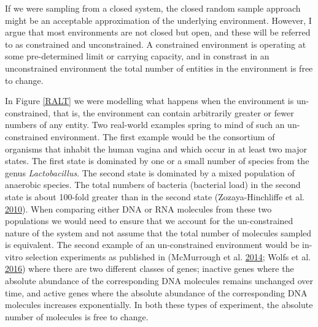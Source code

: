 \documentclass[onecolumn]{book}
\theoremstyle{definition}
\theoremstyle{definition}
\theoremstyle{definition}
\theoremstyle{remark}
\begin{document}
If we were sampling from a closed system, the closed random sample
approach might be an acceptable approximation of the underlying
environment. However, I argue that most environments are not closed but
open, and these will be referred to as constrained and unconstrained. A
constrained environment is operating at some pre-determined limit or
carrying capacity, and in constrast in an unconstrained environment the
total number of entities in the environment is free to change.

In Figure \ref{RALT} we were modelling what happens when the environment
is un-constrained, that is, the environment can contain arbitrarily
greater or fewer numbers of any entity. Two real-world examples spring
to mind of such an un-constrained environment. The first example would
be the consortium of organisms that inhabit the human vagina and which
occur in at least two major states. The first state is dominated by one
or a small number of species from the genus \emph{Lactobacillus}. The
second state is dominated by a mixed population of anaerobic species.
The total numbers of bacteria (bacterial load) in the second state is
about 100-fold greater than in the second state (Zozaya-Hinchliffe et
al. \protect\hyperlink{ref-Zozaya:2010}{2010}). When comparing either
DNA or RNA molecules from these two populations we would need to ensure
that we account for the un-constrained nature of the system and not
assume that the total number of molecules sampled is equivalent. The
second example of an un-constrained environment would be in-vitro
selection experiments as published in (McMurrough et al.
\protect\hyperlink{ref-mcmurrough:2014}{2014}; Wolfs et al.
\protect\hyperlink{ref-Wolfs:2016aa}{2016}) where there are two
different classes of genes; inactive genes where the absolute abundance
of the corresponding DNA molecules remains unchanged over time, and
active genes where the absolute abundance of the corresponding DNA
molecules increases exponentially. In both these types of experiment,
the absolute number of molecules is free to change.
\end{document}
